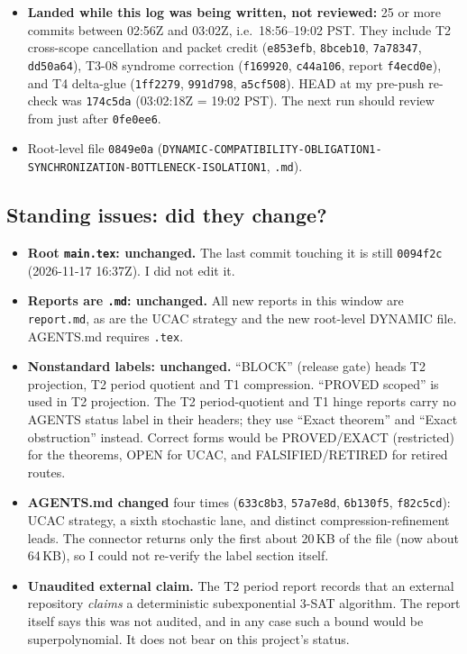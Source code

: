 \documentclass[11pt]{article}
\theoremstyle{definition}
\theoremstyle{remark}
\begin{document}
\begin{itemize}
\texttt{c7f39b8}, \texttt{8758f15}.
\item \textbf{Landed while this log was being written, not reviewed:} 25 or more commits
between 02:56Z and 03:02Z, i.e.\ 18:56--19:02 PST. They include T2 cross-scope cancellation and
packet credit (\texttt{e853efb}, \texttt{8bceb10}, \texttt{7a78347}, \texttt{dd50a64}), T3-08
syndrome correction (\texttt{f169920}, \texttt{c44a106}, report \texttt{f4ecd0e}), and T4
delta-glue (\texttt{1ff2279}, \texttt{991d798}, \texttt{a5cf508}). HEAD at my pre-push
re-check was \texttt{174c5da} (03:02:18Z = 19:02 PST). The next run should review from just
after \texttt{0fe0ee6}.
\item Root-level file \texttt{0849e0a}
(\texttt{DYNAMIC-COMPATIBILITY-}\allowbreak\texttt{OBLIGATION1-}\allowbreak\texttt{SYNCHRONIZATION-}\allowbreak\texttt{BOTTLENECK-ISOLATION1}, \texttt{.md}).
\end{itemize}

\subsection{Standing issues: did they change?}\label{sec:fmt}
\begin{itemize}
\item \textbf{Root \texttt{main.tex}: unchanged.} The last commit touching it is still
\texttt{0094f2c} (2026-11-17 16:37Z). I did not edit it.
\item \textbf{Reports are \texttt{.md}: unchanged.} All new reports in this window are
\texttt{report.md}, as are the UCAC strategy and the new root-level DYNAMIC file.
AGENTS.md requires \texttt{.tex}.
\item \textbf{Nonstandard labels: unchanged.} ``BLOCK'' (release gate) heads T2 projection,
T2 period quotient and T1 compression. ``PROVED scoped'' is used in T2 projection. The T2
period-quotient and T1 hinge reports carry no AGENTS status label in their headers; they
use ``Exact theorem'' and ``Exact obstruction'' instead. Correct forms would be
PROVED/EXACT (restricted) for the theorems, OPEN for UCAC, and FALSIFIED/RETIRED for
retired routes.
\item \textbf{AGENTS.md changed} four times (\texttt{633c8b3}, \texttt{57a7e8d},
\texttt{6b130f5}, \texttt{f82c5cd}): UCAC strategy, a sixth stochastic lane, and distinct
compression-refinement leads. The connector returns only the first about 20\,KB of the
file (now about 64\,KB), so I could not re-verify the label section itself.
\item \textbf{Unaudited external claim.} The T2 period report records that an external
repository \emph{claims} a deterministic subexponential 3-SAT algorithm. The report itself
says this was not audited, and in any case such a bound would be superpolynomial. It does
not bear on this project's status.
\end{itemize}
\end{document}
